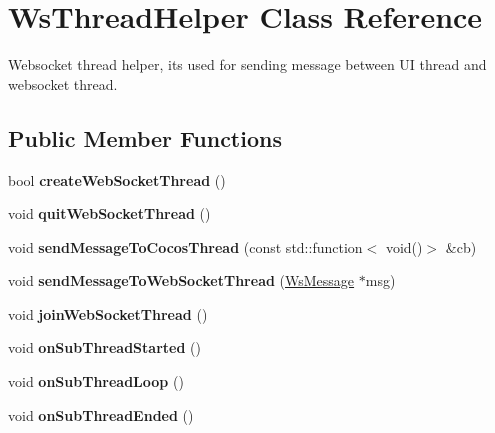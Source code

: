 \hypertarget{classWsThreadHelper}{}\section{Ws\+Thread\+Helper Class Reference}
\label{classWsThreadHelper}


Websocket thread helper, it\textquotesingle{}s used for sending message between UI thread and websocket thread.  


\subsection*{Public Member Functions}
\begin{DoxyCompactItemize}
\item 
\mbox{\label{classWsThreadHelper_a6d52e3fc106f80619453abda90934d73}} 
bool {\bfseries create\+Web\+Socket\+Thread} ()
\item 
\mbox{\label{classWsThreadHelper_a85987f9606bf608be10a91ed7841f823}} 
void {\bfseries quit\+Web\+Socket\+Thread} ()
\item 
\mbox{\label{classWsThreadHelper_a88548dac7027a484c62c1dec10967eb9}} 
void {\bfseries send\+Message\+To\+Cocos\+Thread} (const std\+::function$<$ void()$>$ \&cb)
\item 
\mbox{\label{classWsThreadHelper_a422ed08336e71d9aa8e8c8e3f385accb}} 
void {\bfseries send\+Message\+To\+Web\+Socket\+Thread} (\hyperlink{classWsMessage}{Ws\+Message} $\ast$msg)
\item 
\mbox{\label{classWsThreadHelper_a14d85c3decad2dea0c10e4822e174888}} 
void {\bfseries join\+Web\+Socket\+Thread} ()
\item 
\mbox{\label{classWsThreadHelper_af5d8e8feffa1c2ce73a0f64ce3967fb3}} 
void {\bfseries on\+Sub\+Thread\+Started} ()
\item 
\mbox{\label{classWsThreadHelper_a28da94bd3be6ba024788229c9b2d0261}} 
void {\bfseries on\+Sub\+Thread\+Loop} ()
\item 
\mbox{\label{classWsThreadHelper_a22faf71b67509f0d1ad9345f6b0d9909}} 
void {\bfseries on\+Sub\+Thread\+Ended} ()
\end{DoxyCompactItemize}

